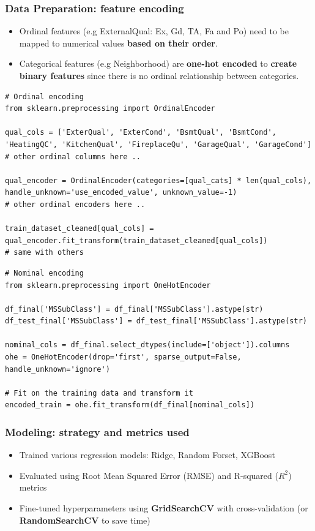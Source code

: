 \documentclass{beamer}
\begin{document}
\begin{frame}
\frametitle{Data Preparation: feature encoding}

\begin{itemize}
    \item Ordinal features (e.g ExternalQual: Ex, Gd, TA, Fa and Po) need to be mapped to numerical values \textbf{based on their order}.
    \item Categorical features (e.g Neighborhood) are \textbf{one-hot encoded} to \textbf{create binary features} since there is no ordinal relationship between categories.
\end{itemize}

\end{frame}

\begin{frame}[fragile]
\begin{verbatim}
# Ordinal encoding
from sklearn.preprocessing import OrdinalEncoder

qual_cols = ['ExterQual', 'ExterCond', 'BsmtQual', 'BsmtCond', 'HeatingQC', 'KitchenQual', 'FireplaceQu', 'GarageQual', 'GarageCond']
# other ordinal columns here ..

qual_encoder = OrdinalEncoder(categories=[qual_cats] * len(qual_cols), handle_unknown='use_encoded_value', unknown_value=-1)
# other ordinal encoders here ..

train_dataset_cleaned[qual_cols] = qual_encoder.fit_transform(train_dataset_cleaned[qual_cols])
# same with others
\end{verbatim}

\begin{verbatim}
# Nominal encoding
from sklearn.preprocessing import OneHotEncoder

df_final['MSSubClass'] = df_final['MSSubClass'].astype(str)
df_test_final['MSSubClass'] = df_test_final['MSSubClass'].astype(str)

nominal_cols = df_final.select_dtypes(include=['object']).columns
ohe = OneHotEncoder(drop='first', sparse_output=False, handle_unknown='ignore')

# Fit on the training data and transform it
encoded_train = ohe.fit_transform(df_final[nominal_cols])
\end{verbatim}
\end{frame}

\begin{frame}
\frametitle{Modeling: strategy and metrics used}

\begin{itemize}
    \item Trained various regression models: Ridge, Random Forset, XGBoost
    \item Evaluated using Root Mean Squared Error (RMSE) and R-squared ($R^2$) metrics
    \item Fine-tuned hyperparameters using \textbf{GridSearchCV} with cross-validation (or \textbf{RandomSearchCV} to save time)
\end{itemize}
\end{frame}
\end{document}
